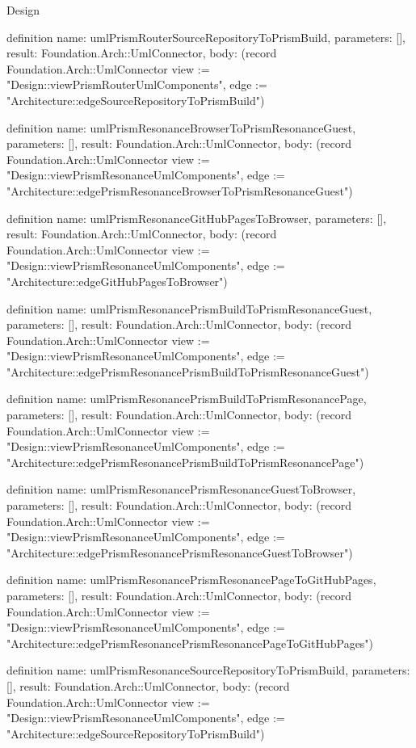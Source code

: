 \begin{lexlean}{Design}
\begin{semanticmodule}
definition{
  name: umlPrismRouterSourceRepositoryToPrismBuild,
  parameters: [],
  result: Foundation.Arch::UmlConnector,
  body: (record Foundation.Arch::UmlConnector {view := "Design::viewPrismRouterUmlComponents", edge := "Architecture::edgeSourceRepositoryToPrismBuild"})
}

definition{
  name: umlPrismResonanceBrowserToPrismResonanceGuest,
  parameters: [],
  result: Foundation.Arch::UmlConnector,
  body: (record Foundation.Arch::UmlConnector {view := "Design::viewPrismResonanceUmlComponents", edge := "Architecture::edgePrismResonanceBrowserToPrismResonanceGuest"})
}

definition{
  name: umlPrismResonanceGitHubPagesToBrowser,
  parameters: [],
  result: Foundation.Arch::UmlConnector,
  body: (record Foundation.Arch::UmlConnector {view := "Design::viewPrismResonanceUmlComponents", edge := "Architecture::edgeGitHubPagesToBrowser"})
}

definition{
  name: umlPrismResonancePrismBuildToPrismResonanceGuest,
  parameters: [],
  result: Foundation.Arch::UmlConnector,
  body: (record Foundation.Arch::UmlConnector {view := "Design::viewPrismResonanceUmlComponents", edge := "Architecture::edgePrismResonancePrismBuildToPrismResonanceGuest"})
}

definition{
  name: umlPrismResonancePrismBuildToPrismResonancePage,
  parameters: [],
  result: Foundation.Arch::UmlConnector,
  body: (record Foundation.Arch::UmlConnector {view := "Design::viewPrismResonanceUmlComponents", edge := "Architecture::edgePrismResonancePrismBuildToPrismResonancePage"})
}

definition{
  name: umlPrismResonancePrismResonanceGuestToBrowser,
  parameters: [],
  result: Foundation.Arch::UmlConnector,
  body: (record Foundation.Arch::UmlConnector {view := "Design::viewPrismResonanceUmlComponents", edge := "Architecture::edgePrismResonancePrismResonanceGuestToBrowser"})
}

definition{
  name: umlPrismResonancePrismResonancePageToGitHubPages,
  parameters: [],
  result: Foundation.Arch::UmlConnector,
  body: (record Foundation.Arch::UmlConnector {view := "Design::viewPrismResonanceUmlComponents", edge := "Architecture::edgePrismResonancePrismResonancePageToGitHubPages"})
}

definition{
  name: umlPrismResonanceSourceRepositoryToPrismBuild,
  parameters: [],
  result: Foundation.Arch::UmlConnector,
  body: (record Foundation.Arch::UmlConnector {view := "Design::viewPrismResonanceUmlComponents", edge := "Architecture::edgeSourceRepositoryToPrismBuild"})
}


\end{semanticmodule}
\end{lexlean}
